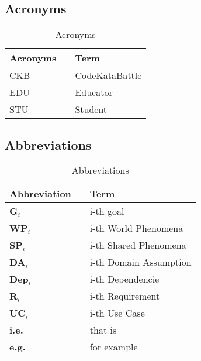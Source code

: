 \subsection{Acronyms}
\begin{table}[H]
    \centering
    \renewcommand{\arraystretch}{1.5}
    \begin{tabular}{l l p{11cm}}
        \hline
        \textbf{Acronyms} &  & \textbf{Term}  \\
        \hline
        CKB               &  & CodeKataBattle \\
        EDU               &  & Educator       \\
        STU               &  & Student        \\
        \hline
    \end{tabular}
    \caption{Acronyms}
\end{table}

\subsection{Abbreviations}
\begin{table}[H]
    \centering
    \renewcommand{\arraystretch}{1.5}
    \begin{tabular}{l l p{10.5cm}}
        \hline
        \textbf{Abbreviation} &  & \textbf{Term}          \\
        \hline
        \textbf{G}\(_i\)      &  & i-th goal              \\
        \textbf{WP}\(_i\)     &  & i-th World Phenomena   \\
        \textbf{SP}\(_i\)     &  & i-th Shared Phenomena  \\
        \textbf{DA}\(_i\)     &  & i-th Domain Assumption \\
        \textbf{Dep}\(_i\)    &  & i-th Dependencie       \\
        \textbf{R}\(_i\)      &  & i-th Requirement       \\
        \textbf{UC}\(_i\)     &  & i-th Use Case          \\
        \textbf{i.e.}         &  & that is                \\
        \textbf{e.g.}         &  & for example            \\
        \hline
    \end{tabular}
    \caption{Abbreviations}
\end{table}

